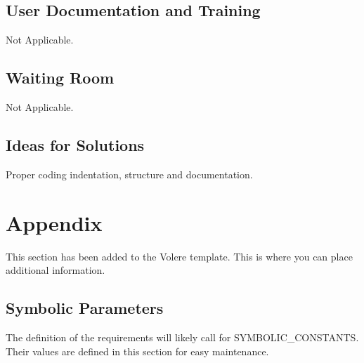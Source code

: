 \documentclass[12pt, titlepage]{article}
\begin{document}
    	\subsection{User Documentation and Training}
    	Not Applicable.

    	\subsection{Waiting Room}
    	Not Applicable.

    	\subsection{Ideas for Solutions}
    	Proper coding indentation, structure and documentation.

	\newpage
    

    


    \section{Appendix}

    This section has been added to the Volere template.  This is where you can place
    additional information.

    \subsection{Symbolic Parameters}

    The definition of the requirements will likely call for SYMBOLIC\_CONSTANTS.
    Their values are defined in this section for easy maintenance.
\end{document}
